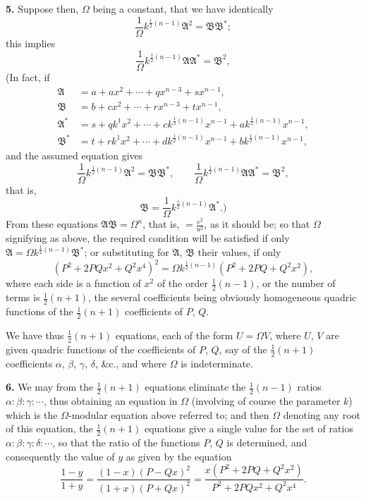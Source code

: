 \documentclass[11pt,a4paper]{book}
\begin{document}
\medskip
\noindent\textbf{5.} Suppose then, $\Omega$ being a constant, that we have identically
\[
\frac{1}{\Omega}k^{\frac{1}{2}(n - 1)}\mathfrak{A}^2 = \mathfrak{B}\mathfrak{B}^*;
\]
this implies
\[
\frac{1}{\Omega}k^{\frac{1}{2}(n - 1)}\mathfrak{A}\mathfrak{A}^* = \mathfrak{B}^2,
\]
(In fact, if
\begin{align*}
\mathfrak{A} &= a + ax^2 + \cdots + qx^{n-3} + sx^{n-1}, \\
\mathfrak{B} &= b + cx^2 + \cdots + rx^{n-3} + tx^{n-1}, \\
\mathfrak{A}^* &= s + qk^1x^2 + \cdots + ck^{\frac{1}{2}(n-1)}x^{n-1} + ak^{\frac{1}{2}(n-1)}x^{n-1}, \\
\mathfrak{B}^* &= t + rk^1x^2 + \cdots + dk^{\frac{1}{2}(n-1)}x^{n-1} + bk^{\frac{1}{2}(n-1)}x^{n-1},
\end{align*}
and the assumed equation gives
\[
\frac{1}{\Omega}k^{\frac{1}{2}(n-1)}\mathfrak{A}^2 = \mathfrak{B}\mathfrak{B}^*, \qquad
\frac{1}{\Omega}k^{\frac{1}{2}(n-1)}\mathfrak{A}\mathfrak{A}^* = \mathfrak{B}^2,
\]
that is,
\[
\mathfrak{B} = \frac{1}{\Omega}k^{\frac{1}{2}(n-1)}\mathfrak{A}^*.)
\]
From these equations $\mathfrak{A}\mathfrak{B} = \Omega^n$, that is, $= \frac{v^2}{u^2}$, as it should be; so that $\Omega$ signifying as above, the required condition will be satisfied if only $\mathfrak{A} = \Omega k^{\frac{1}{2}(n-1)}\mathfrak{B}^*$; or substituting for $\mathfrak{A}$, $\mathfrak{B}$ their values, if only
\[
(P^2 + 2PQx^2 + Q^2x^4)^2 = \Omega k^{\frac{1}{2}(n-1)}(P^2 + 2PQ + Q^2x^2),
\]
where each side is a function of $x^2$ of the order $\frac{1}{2}(n - 1)$, or the number of terms is $\frac{1}{2}(n + 1)$, the several coefficients being obviously homogeneous quadric functions of the $\frac{1}{2}(n + 1)$ coefficients of $P$, $Q$.

We have thus $\frac{1}{2}(n + 1)$ equations, each of the form $U = \Omega V$, where $U$, $V$ are given quadric functions of the coefficients of $P$, $Q$, say of the $\frac{1}{2}(n + 1)$ coefficients $\alpha$, $\beta$, $\gamma$, $\delta$, \&c., and where $\Omega$ is indeterminate.

\medskip
\noindent\textbf{6.} We may from the $\frac{1}{2}(n + 1)$ equations eliminate the $\frac{1}{2}(n - 1)$ ratios $\alpha : \beta : \gamma : \cdots$, thus obtaining an equation in $\Omega$ (involving of course the parameter $k$) which is the $\Omega$-modular equation above referred to; and then $\Omega$ denoting any root of this equation, the $\frac{1}{2}(n + 1)$ equations give a single value for the set of ratios $\alpha : \beta : \gamma : \delta : \cdots$, so that the ratio of the functions $P$, $Q$ is determined, and consequently the value of $y$ as given by the equation
\[
\frac{1 - y}{1 + y} = \frac{(1 - x)(P - Qx)^2}{(1 + x)(P + Qx)^2} = \frac{x(P^2 + 2PQ + Q^2x^2)}{P^2 + 2PQx^2 + Q^2x^4}.
\]
\end{document}
